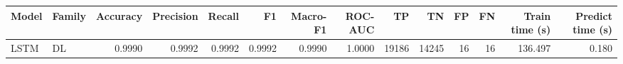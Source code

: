 \begin{tabular}{llrrrrrrrrrrrr}
\toprule
Model & Family & Accuracy & Precision & Recall & F1 & Macro-F1 & ROC-AUC & TP & TN & FP & FN & Train time (s) & Predict time (s) \\
\midrule
LSTM & DL & 0.9990 & 0.9992 & 0.9992 & 0.9992 & 0.9990 & 1.0000 & 19186 & 14245 & 16 & 16 & 136.497 & 0.180 \\
\bottomrule
\end{tabular}
